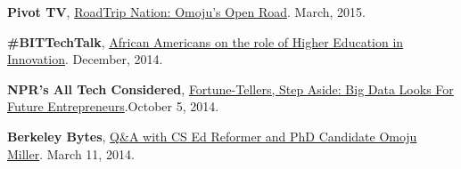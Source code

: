 \documentclass[11pt,article,oneside]{memoir}
\begin{document}
\ind \textbf{Pivot TV}, \href{http://roadtripnation.com/leader/omoju-miller}{RoadTrip Nation: Omoju's Open Road}. March, 2015.

\ind \textbf{\#BITTechTalk}, \href{https://www.blacksintechnology.net/the-road-to-50-podcast-african-americans-on-the-role-of-higher-education-in-innovation/}{African Americans on the role of Higher Education in Innovation}. December, 2014.

\ind \textbf{NPR's  All Tech Considered}, \href{http://www.npr.org/sections/alltechconsidered/2014/10/05/351851015/fortune-tellers-step-aside-big-data-looks-for-future-entrepreneurs}{Fortune-Tellers, Step Aside: Big Data Looks For Future Entrepreneurs}.October 5, 2014.

\ind \textbf{Berkeley Bytes}, \href{http://best.berkeley.edu/2015/03/11/best-labber-in-berkeley-byte-qa-with-cs-ed-reformer-and-phd-candidate-omoju-miller/}{Q\&A with CS Ed Reformer and PhD Candidate Omoju Miller}. March 11, 2014.
\end{document}
